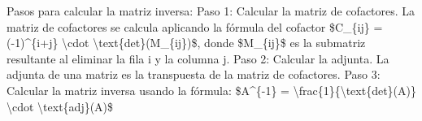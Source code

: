 \documentclass{article}%
\begin{document}
\newline%
\newline%
Pasos para calcular la matriz inversa:%
\newline%
Paso 1: Calcular la matriz de cofactores.%
\newline%
La matriz de cofactores se calcula aplicando la fórmula del cofactor \$C\_\{ij\} = ({-}1)\^{}\{i+j\} \textbackslash{}cdot \textbackslash{}text\{det\}(M\_\{ij\})\$, donde \$M\_\{ij\}\$ es la submatriz resultante al eliminar la fila i y la columna j.%
\newline%
Paso 2: Calcular la adjunta.%
\newline%
La adjunta de una matriz es la transpuesta de la matriz de cofactores.%
\newline%
Paso 3: Calcular la matriz inversa usando la fórmula:%
\newline%
\$A\^{}\{{-}1\} = \textbackslash{}frac\{1\}\{\textbackslash{}text\{det\}(A)\} \textbackslash{}cdot \textbackslash{}text\{adj\}(A)\$%
\newline

%
\end{document}
